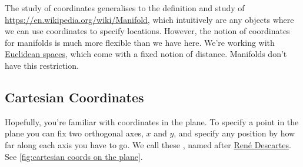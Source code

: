 \documentclass[fleqn]{LectureClass/LectureClass}
\begin{document}
    \begin{remark}{}{}
        The study of coordinates generalises to the definition and study of \href{manifolds}{https://en.wikipedia.org/wiki/Manifold}, which intuitively are any objects where we can use coordinates to specify locations.
        However, the notion of coordinates for manifolds is much more flexible than we have here.
        We're working with \href{https://en.wikipedia.org/wiki/Euclidean_space}{Euclidean spaces}, which come with a fixed notion of distance.
        Manifolds don't have this restriction.
    \end{remark}
     
    \subsection{Cartesian Coordinates}
    Hopefully, you're familiar with coordinates in the plane.
    To specify a point in the plane you can fix two orthogonal axes, \(x\) and \(y\), and specify any position by how far along each axis you have to go.
    We call these , named after \href{https://en.wikipedia.org/wiki/Ren%C3%A9_Descartes}{Ren\'e Descartes}.
    See \cref{fig:cartesian coords on the plane}.
     
\end{document}
